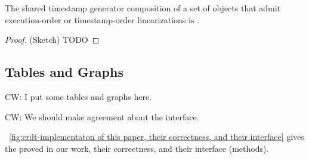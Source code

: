 \begin{theorem}\label{th:t0}
The shared timestamp generator composition of a set of \crdtlinearizable{} objects that admit execution-order or timestamp-order linearizations is \crdtlinearizable{}.
\end{theorem}
\begin{proof}(Sketch)
TODO
\end{proof}



\subsection{Tables and Graphs}
\label{lemma:tables and graphs}

{\color {red}CW: I put some tables and graphs here.}

{\color {red}CW: We should make agreement about the interface.}

\figurename~\ref{fig:crdt-implementaton of this paper, their correctness, and their interface} gives the \crdtimp{} proved in our work, their correctness, and their interface (methods).

